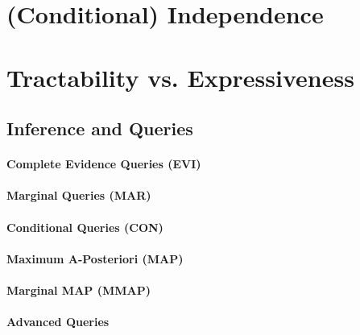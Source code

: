 	\section{(Conditional) Independence} %

	\section{Tractability vs. Expressiveness} %

		\subsection{Inference and Queries} %

			\paragraph{Complete Evidence Queries (EVI)} %

			\paragraph{Marginal Queries (MAR)} %

			\paragraph{Conditional Queries (CON)} %

			\paragraph{Maximum A-Posteriori (MAP)} %

			\paragraph{Marginal MAP (MMAP)} %

			\paragraph{Advanced Queries} %

